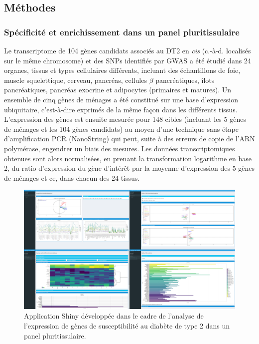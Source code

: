 \documentclass[11pt,a4paper,notrimn]{krantz}
\theoremstyle{definition}
\theoremstyle{definition}
\theoremstyle{remark}
\begin{document}
\subsection{Méthodes}\label{methodes-1}

\subsubsection{Spécificité et enrichissement dans un panel
pluritissulaire}\label{specificite-et-enrichissement-dans-un-panel-pluritissulaire}

Le transcriptome de 104 gènes candidats associés au DT2 en \emph{cis}
(c.-à-d. localisés sur le même chromosome) et des SNPs identifiés par
GWAS a été étudié dans 24 organes, tissus et types cellulaires
différents, incluant des échantillons de foie, muscle squelettique,
cerveau, pancréas, cellules \(\beta\) pancréatiques, îlots
pancréatiques, pancréas exocrine et adipocytes (primaires et matures).
Un ensemble de cinq gènes de ménages a été constitué sur une base
d'expression ubiquitaire, c'est-à-dire exprimés de la même façon dans
les différents tissus. L'expression des gènes est ensuite mesurée pour
148 cibles (incluant les 5 gènes de ménages et les 104 gènes candidats)
au moyen d'une technique sans étape d'amplification PCR (NanoString) qui
peut, suite à des erreurs de copie de l'ARN polymérase, engendrer un
biais des mesures. Les données transcriptomiques obtenues sont alors
normalisées, en prenant la transformation logarithme en base 2, du ratio
d'expression du gène d'intérêt par la moyenne d'expression des 5 gènes
de ménages et ce, dans chacun des 24 tissus.





\begin{figure}[!htb]

{\centering \includegraphics[width=6in]{FiguresTables/App2} 

}

\caption{Application Shiny développée dans le cadre de l'analyse de
l'expression de gènes de susceptibilité au diabète de type 2 dans un
panel pluritissulaire.}\label{fig:App2}
\end{figure}
\end{document}
